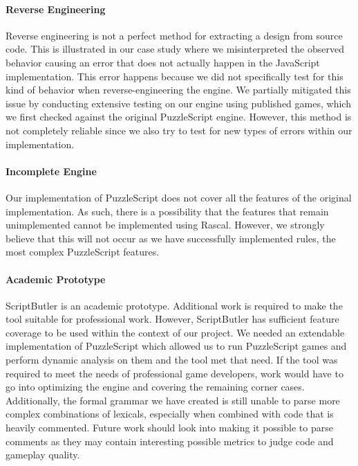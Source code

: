 
\paragraph{Reverse Engineering}
Reverse engineering is not a perfect method for extracting a design from source code. This is illustrated in our case study where we misinterpreted the observed behavior causing an error that does not actually happen in the JavaScript implementation. This error happens because we did not specifically test for this kind of behavior when reverse-engineering the engine. We partially mitigated this issue by conducting extensive testing on our engine using published games, which we first checked against the original PuzzleScript engine. However, this method is not completely reliable since we also try to test for new types of errors within our implementation.

\paragraph{Incomplete Engine}
Our implementation of PuzzleScript does not cover all the features of the original implementation. As such, there is a possibility that the features that remain unimplemented cannot be implemented using Rascal. However, we strongly believe that this will not occur as we have successfully implemented rules, the most complex PuzzleScript features. 


\paragraph{Academic Prototype}
ScriptButler is an academic prototype. Additional work is required to make the tool suitable for professional work. However, ScriptButler has sufficient feature coverage to be used within the context of our project. We needed an extendable implementation of PuzzleScript which allowed us to run PuzzleScript games and perform dynamic analysis on them and the tool met that need. If the tool was required to meet the needs of professional game developers, work would have to go into optimizing the engine and covering the remaining corner cases. Additionally, the formal grammar we have created is still unable to parse more complex combinations of lexicals, especially when combined with code that is heavily commented. Future work should look into making it possible to parse comments as they may contain interesting possible metrics to judge code and gameplay quality\cite{TAN2015493}.

